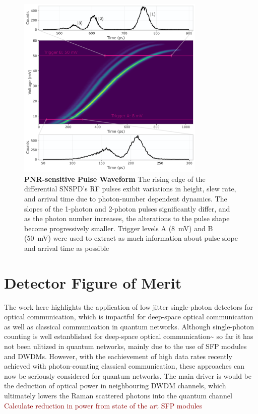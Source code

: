 \documentclass[11pt]{caltech_thesis} %
\begin{document}
\hypertarget{fig:waveform}{%
\begin{figure}
\centering
\includegraphics[width=0.8\textwidth,height=\textheight]{chapter_03/figs_03/waveform_light.pdf}
\caption[{PNR-sensitive Pulse Waveform}]{\textbf{PNR-sensitive Pulse
Waveform} The rising edge of the differential SNSPD's RF pulses exibit
variations in height, slew rate, and arrival time due to photon-number
dependent dynamics. The slopes of the 1-photon and 2-photon pulses
significantly differ, and as the photon number increases, the
alterations to the pulse shape become progressively smaller. Trigger
levels A (8~mV) and B (50~mV) were used to extract as much information
about pulse slope and arrival time as possible}
\label{fig:waveform}
\end{figure}
}

\hypertarget{detector-figure-of-merit-1}{%
\section{Detector Figure of Merit}\label{detector-figure-of-merit-1}}

The work here highlights the application of low jitter single-photon
detectors for optical communication, which is impactful for deep-space
optical communication as well as classical communication in quantum
networks. Although single-photon counting is well estanblished for
deep-space optical
communication\textasciitilde{}\cite{Laser lunar, DSOC} so far it has not
been ulitized in quantum networks, mainly due to the use of SFP modules
and DWDMs. However, with the eachievement of high data rates recently
achieved with photon-counting classical communication, these approaches
can now be seriously considered for quantum networks. The main driver is
would be the deduction of optical power in neighbouring DWDM channels,
which ultimately lowers the Raman scattered photons into the quantum
channel \autocite{EraerdsRaman} \textcolor{darkred}{Calculate reduction
in power from state of the art SFP modules}
\end{document}
